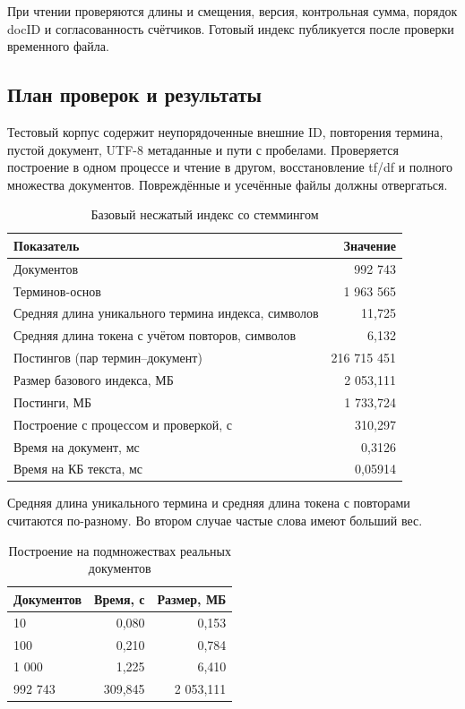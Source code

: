 \documentclass[12pt,a4paper]{article}
\newcommand{\sub}[1]{\subsection{#1}}
\begin{document}
При чтении проверяются длины и смещения, версия, контрольная сумма, порядок docID и согласованность счётчиков. Готовый индекс публикуется после проверки временного файла.
\sub{План проверок и результаты}
Тестовый корпус содержит неупорядоченные внешние ID, повторения термина, пустой документ, UTF-8 метаданные и пути с пробелами. Проверяется построение в одном процессе и чтение в другом, восстановление tf/df и полного множества документов. Повреждённые и усечённые файлы должны отвергаться.

\begin{table}[H]\centering\small
\caption{Базовый несжатый индекс со стеммингом}
\begin{tabularx}{\linewidth}{|X|r|}\hline
Показатель & Значение \\\hline
Документов & 992 743 \\\hline
Терминов-основ & 1 963 565 \\\hline
Средняя длина уникального термина индекса, символов & 11,725 \\\hline
Средняя длина токена с учётом повторов, символов & 6,132 \\\hline
Постингов (пар термин–документ) & 216 715 451 \\\hline
Размер базового индекса, МБ & 2 053,111 \\\hline
Постинги, МБ & 1 733,724 \\\hline
Построение с процессом и проверкой, с & 310,297 \\\hline
Время на документ, мс & 0,3126 \\\hline
Время на КБ текста, мс & 0,05914 \\\hline
\end{tabularx}\end{table}

Средняя длина уникального термина и средняя длина токена с повторами считаются по-разному. Во втором случае частые слова имеют больший вес.

\begin{table}[H]\centering\small
\caption{Построение на подмножествах реальных документов}
\begin{tabularx}{\linewidth}{|X|r|r|}\hline
Документов & Время, с & Размер, МБ \\\hline
10 & 0,080 & 0,153 \\\hline
100 & 0,210 & 0,784 \\\hline
1 000 & 1,225 & 6,410 \\\hline
992 743 & 309,845 & 2 053,111 \\\hline
\end{tabularx}\end{table}
\end{document}
